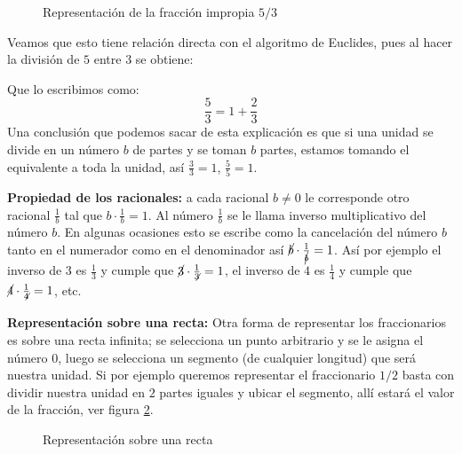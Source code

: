 \begin{enumerate}
    \begin{figure}[ht]
    \caption{Representación de la fracción impropia $5/3$}\label{fig:fraccion02}
    \centering
    \end{figure}

    Veamos que esto tiene relación directa con el algoritmo de Euclides, pues al hacer la división de $5$ entre $3$ se obtiene:
    \begin{center}
    \end{center}
    Que lo escribimos como: 
    \[ \frac{5}{3}=1+\frac{2}{3} \]
    Una conclusión que podemos sacar de esta explicación es que si una unidad se divide en un número $b$ de partes y se toman $b$ partes, estamos tomando el equivalente a toda la unidad, así $\frac{3}{3}=1$, $\frac{5}{5}=1$. 

    \textbf{Propiedad de los racionales:} a cada racional $b\neq 0$ le corresponde otro racional $\frac{1}{b}$ tal que $b\cdot\frac{1}{b}=1$. Al número $\frac{1}{b}$ se le llama inverso multiplicativo del número $b$. En algunas ocasiones esto se escribe como la cancelación del número $b$ tanto en el numerador como en el denominador así $\cancel{b}\cdot{\frac{1}{\cancel{b}}}=1$. Así por ejemplo el inverso de $3$ es $\frac{1}{3}$ y cumple que $\cancel{3}\cdot\frac{1}{\not3}=1$, el inverso de $4$ es $\frac{1}{4}$ y cumple que $\cancel{4}\cdot\frac{1}{\not4}=1$, etc.

    \textbf{Representación sobre una recta:} Otra forma de representar los fraccionarios es sobre una recta infinita; se selecciona un punto arbitrario y se le asigna el número $0$, luego se selecciona un segmento (de cualquier longitud) que será nuestra unidad. Si por ejemplo queremos representar el fraccionario $1/2$ basta con dividir nuestra unidad en $2$ partes iguales y ubicar el segmento, allí estará el valor de la fracción, ver figura \ref{fig:fraccion03}.

    \begin{figure}[ht]
    \caption{Representación sobre una recta}\label{fig:fraccion03}
    \centering
    \end{figure}


\end{enumerate}
